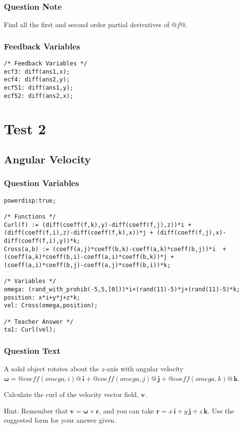 \documentclass[a4paper,10pt]{article}
\begin{document}
\subsubsection{Question Note}
Find all the first and second order partial derivatives of \(@f@\).
\subsubsection{Feedback Variables}
\begin{lstlisting}
/* Feedback Variables */
ecf3: diff(ans1,x);
ecf4: diff(ans2,y);
ecf51: diff(ans1,y);
ecf52: diff(ans2,x);
\end{lstlisting}

\section{Test 2}

\subsection{Angular Velocity}
\subsubsection{Question Variables}
\begin{lstlisting}
powerdisp:true;

/* Functions */
Curl(f) := (diff(coeff(f,k),y)-diff(coeff(f,j),z))*i + (diff(coeff(f,i),z)-diff(coeff(f,k),x))*j + (diff(coeff(f,j),x)-diff(coeff(f,i),y))*k;
Cross(a,b) := (coeff(a,j)*coeff(b,k)-coeff(a,k)*coeff(b,j))*i  + (coeff(a,k)*coeff(b,i)-coeff(a,i)*coeff(b,k))*j + (coeff(a,i)*coeff(b,j)-coeff(a,j)*coeff(b,i))*k;

/* Variables */
omega: (rand_with_prohib(-5,5,[0]))*i+(rand(11)-5)*j+(rand(11)-5)*k;
position: x*i+y*j+z*k;
vel: Cross(omega,position);

/* Teacher Answer */
ta1: Curl(vel);
\end{lstlisting}
\subsubsection{Question Text}
A solid object rotates about the \(z\)-axis with angular velocity \( \boldsymbol{\omega} = @coeff(omega,i)@ \, \mathbf{i} + @coeff(omega,j)@ \, \mathbf{j} + @coeff(omega,k)@ \, \mathbf{k} \).

Calculate the curl of the velocity vector field, \(\mathbf{v}\).

Hint: Remember that \(\mathbf{v} =\boldsymbol{\omega} \times \mathbf{r}\), and you can take \(\mathbf{r} = x \, \mathbf{i} + y \, \mathbf{j} + z \, \mathbf{k}\). Use the suggested form for your answer given.
\end{document}
